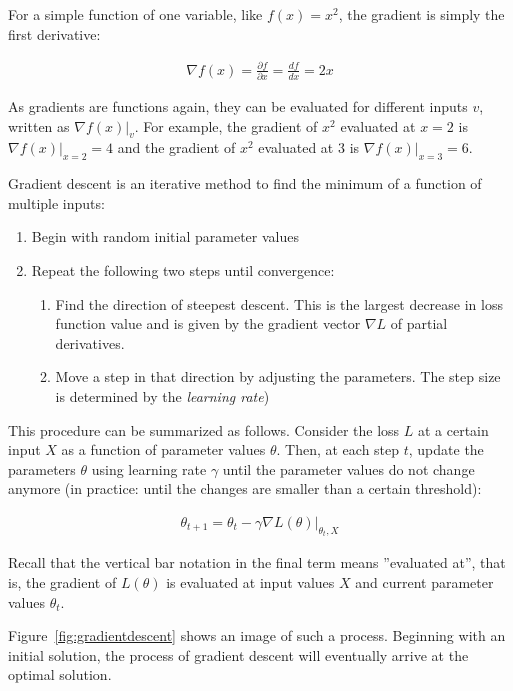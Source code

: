 For a simple function of one variable, like $f(x) = x^2$, the gradient is simply the first derivative:

\begin{align*}
\nabla f(x) = \frac{\partial f}{\partial x} = \frac{d f}{d x} = 2x 
\end{align*}

As gradients are functions again, they can be evaluated for different inputs $v$, written as $\nabla f(x) \rvert_{v}$. For example, the gradient of $x^2$ evaluated at $x=2$ is $\nabla f(x) \rvert_{x=2} = 4$ and the gradient of $x^2$ evaluated at $3$ is $\nabla f(x) \rvert_{x=3} = 6$.

\noindent Gradient descent is an iterative method to find the minimum of a function of multiple inputs:
\begin{enumerate}
   \item Begin with random initial parameter values
   \item Repeat the following two steps until convergence:
   \begin{enumerate}
      \item Find the direction of steepest descent. This is the largest decrease in loss function value and is given by the gradient vector $\nabla L$ of partial derivatives.
      \item Move a step in that direction by adjusting the parameters. The step size is determined by the \emph{learning rate})
   \end{enumerate}
\end{enumerate}

This procedure can be summarized as follows. Consider the loss $L$ at a certain input $X$ as a function of parameter values $\theta$. Then, at each step $t$, update the parameters $\theta$ using learning rate $\gamma$ until the parameter values do not change anymore (in practice: until the changes are smaller than a certain threshold):

\begin{align}
\theta_{t+1} = \theta_t - \gamma \nabla L(\theta) \rvert_{\theta_t, X} \label{eq:gradientupdate}
\end{align}

Recall that the vertical bar notation in the final term means ''evaluated at'', that is, the gradient of $L(\theta)$ is evaluated at input values $X$ and current parameter values $\theta_t$.

Figure~\ref{fig:gradientdescent} shows an image of such a process. Beginning with an initial solution, the process of gradient descent will eventually arrive at the optimal solution.

